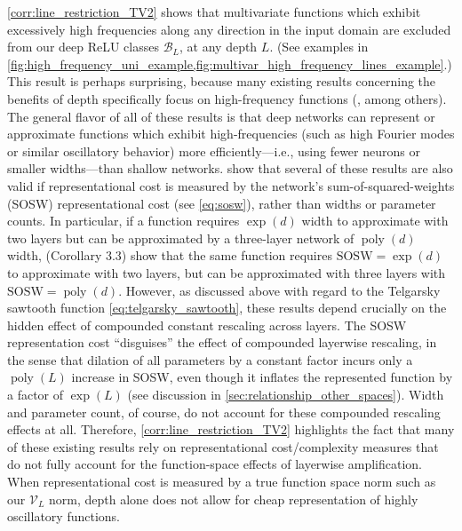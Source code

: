 \documentclass{article}
\DeclareMathOperator{\poly}{\mathrm{poly}}
\def\cB{{\mathcal{B}}}
\def\cV{{\mathcal{V}}}
\begin{document}
\cref{corr:line_restriction_TV2} shows that multivariate functions which exhibit excessively high frequencies along any direction in the input domain are excluded from our deep ReLU classes $\cB_L$, at any depth $L$. (See examples in \cref{fig:high_frequency_uni_example,fig:multivar_high_frequency_lines_example}.) This result is perhaps surprising, because many existing results concerning the benefits of depth specifically focus on high-frequency functions (\cite{telgarsky2016benefits,eldan2016power,daniely2017depth,perekrestenko2018universal, chatziafratisdepth, bresler2020sharp,venturi2022depth}, among others). The general flavor of all of these results is that deep networks can represent or approximate functions which exhibit high-frequencies (such as high Fourier modes or similar oscillatory behavior) more efficiently---i.e., using fewer neurons or smaller widths---than shallow networks. \cite{parkinson2024depth} show that several of these results are also valid if representational cost is measured by the network's sum-of-squared-weights (SOSW) representational cost (see \eqref{eq:sosw}), rather than widths or parameter counts. In particular, if a function requires $\exp(d)$ width to approximate with two layers but can be approximated by a three-layer network of $\poly(d)$ width, \cite{parkinson2024depth} (Corollary 3.3) show that the same function requires $\mathrm{SOSW} = \exp(d)$ to approximate with two layers, but can be approximated with three layers with $\mathrm{SOSW} = \poly(d)$. However, as discussed above with regard to the Telgarsky sawtooth function \eqref{eq:telgarsky_sawtooth}, these results depend crucially on the hidden effect of compounded constant rescaling across layers. The SOSW representation cost ``disguises'' the effect of compounded layerwise rescaling, in the sense that dilation of all parameters by a constant factor incurs only a $\poly(L)$ increase in SOSW, even though it inflates the represented function by a factor of $\exp(L)$ (see discussion in \cref{sec:relationship_other_spaces}). Width and parameter count, of course, do not account for these compounded rescaling effects at all. Therefore, \cref{corr:line_restriction_TV2} highlights the fact that many of these existing results rely on representational cost/complexity measures that do not fully account for the function-space effects of layerwise amplification. When representational cost is measured by a true function space norm such as our $\cV_L$ norm, depth alone does not allow for cheap representation of highly oscillatory functions.
\end{document}
